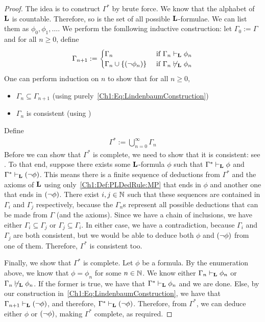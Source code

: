 \begin{proof}
    The idea is to construct $\Gamma^*$ by brute force. We know that the alphabet of $\mathbf{L}$ is countable. Therefore, so is the set of all possible $\mathbf{L}$-formulae. We can list them as $\phi_0, \phi_1, \ldots$. We perform the fomllowing inductive construction: let $\Gamma_0 := \Gamma$ and for all $n \geq 0$, define
    \begin{align}
        \Gamma_{n + 1} :=
        \begin{cases}
            \Gamma_n & \text{ if } \Gamma_n \vdash_{\mathbf{L}} \phi_n \\
            \Gamma_{n} \cup \left\{ \left( \neg \phi_n \right) \right\} & \text{ if } \Gamma_n \not\vdash_{\mathbf{L}} \phi_n
        \end{cases}
        \label{Ch1:Eq:LindenbaumConstruction}
    \end{align}
    One can perform induction on $n$ to show that for all $n \geq 0$,
    \begin{itemize}[noitemsep]
        \item $\Gamma_n \subseteq \Gamma_{n + 1}$ (using purely~\eqref{Ch1:Eq:LindenbaumConstruction})
        \item $\Gamma_n$ is consistent (using )
    \end{itemize}
    Define
    \begin{align*}
        \Gamma^* := \bigcup_{n = 0}^{\infty} \Gamma_n
    \end{align*}
    Before we can show that $\Gamma^*$ is complete, we need to show that it is consistent: see . To that end, suppose there exists some $\mathbf{L}$-formula $\phi$ such that $\Gamma^* \vdash_{\mathbf{L}} \phi$ and $\Gamma^* \vdash_{\mathbf{L}} \left( \neg \phi \right)$. This means there is a finite sequence of deductions from $\Gamma^*$ and the axioms of $\mathbf{L}$ using only~\ref{Ch1:Def:PLDedRule:MP} that ends in $\phi$ and another one that ends in $\left( \neg \phi \right)$. There exist $i, j \in \mathbb{N}$ such that these sequences are contained in $\Gamma_i$ and $\Gamma_j$ respectively, because the $\Gamma_n$s represent all possible deductions that can be made from $\Gamma$ (and the axioms). Since we have a chain of inclusions, we have either $\Gamma_i \subseteq \Gamma_j$ or $\Gamma_j \subseteq \Gamma_i$. In either case, we have a contradiction, because $\Gamma_i$ and $\Gamma_j$ are both consistent, but we would be able to deduce both $\phi$ and $\left( \neg \phi \right)$ from one of them. Therefore, $\Gamma^*$ is consistent too.

    Finally, we show that $\Gamma^*$ is complete. Let $\phi$ be a formula. By the enumeration above, we know that $\phi = \phi_n$ for some $n \in \mathbb{N}$. We know either $\Gamma_n \vdash_{\mathbf{L}} \phi_n$ or $\Gamma_n \not\vdash_{\mathbf{L}} \phi_n$. If the former is true, we have that $\Gamma^* \vdash_{\mathbf{L}} \phi_n$ and we are done. Else, by our construction in~\eqref{Ch1:Eq:LindenbaumConstruction}, we have that $\Gamma_{n+1} \vdash_{\mathbf{L}} \left( \neg \phi \right)$, and therefore, $\Gamma^* \vdash_{\mathbf{L}} \left( \neg \phi \right)$. Therefore, from $\Gamma^*$, we can deduce either $\phi$ or $\left( \neg \phi \right)$, making $\Gamma^*$ complete, as required.
\end{proof}


